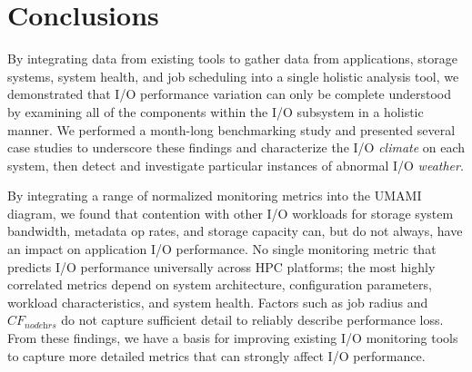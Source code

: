 \section{Conclusions} \label{sec:conclusions}

By integrating data from existing tools to gather data from applications, storage systems, system health, and job scheduling into a single holistic analysis tool, we demonstrated that I/O performance variation can only be complete understood by examining all of the components within the I/O subsystem in a holistic manner.  We performed a month-long benchmarking study and presented several case studies to underscore these findings and characterize the I/O \emph{climate} on each system, then detect and investigate particular instances of abnormal I/O \emph{weather}.

By integrating a range of normalized monitoring metrics into the UMAMI diagram, we found that
contention with other I/O workloads for storage system bandwidth, metadata op rates, and storage capacity can, but do not always, have an impact on application I/O performance.
No single monitoring metric that predicts I/O performance universally across HPC platforms;
the most highly correlated metrics depend on system architecture, configuration parameters, workload characteristics, and system health.
Factors such as job radius and $\textit{CF}_{\textit{nodehrs}}$ do not capture sufficient detail to reliably describe performance loss.
From these findings, we have a basis for improving existing I/O monitoring tools to capture more detailed metrics that can strongly affect I/O performance.